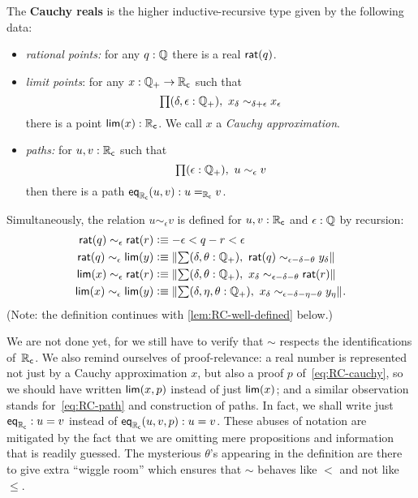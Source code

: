 \begin{defn}\label{defn:cauchy-reals}
  The \textbf{Cauchy reals \RC} is the higher inductive-recursive type given by the
  following data:
  \begin{itemize}
  \item \emph{rational points:} 
    for any $q : \Q$ there is a real $\rcrat(q)$.
  \item \emph{limit points}:
    for any $x : \Qp \to \RC$ such that
    \begin{equation}
      \label{eq:RC-cauchy}
      \prd{\delta, \epsilon : \Qp} x_\delta \sim_{\delta + \epsilon} x_\epsilon
    \end{equation}
    there is a point $\rclim(x) : \RC$. We call $x$ a \emph{Cauchy approximation}.
  \item \emph{paths:}
    for $u, v : \RC$ such that
    \begin{equation}
      \label{eq:RC-path}
      \prd{\epsilon : \Qp} u \sim_\epsilon v
    \end{equation}
    then there is a path $\rceq(u, v) : \id[\RC]{u}{v}$.
  \end{itemize}
  Simultaneously, the relation $u \sim_\epsilon v$ is defined for $u, v : \RC$ and
  $\epsilon : \Q$ by recursion:
  \begin{align*}
    \rcrat(q) \sim_\epsilon \rcrat(r)  &\defeq
    -\epsilon < q - r < \epsilon
    \\
    \rcrat(q) \sim_\epsilon \rclim(y) &\defeq
    \brck{\sm{\delta, \theta : \Qp} \rcrat(q) \sim_{\epsilon - \delta - \theta} y_\delta}
    \\
    \rclim(x) \sim_\epsilon \rcrat(r) &\defeq
    \brck{\sm{\delta, \theta : \Qp} x_\delta \sim_{\epsilon - \delta - \theta} \rcrat(r)}
    \\
    \rclim(x) \sim_\epsilon \rclim(y) &\defeq
    \brck{\sm{\delta, \eta, \theta : \Qp} x_\delta \sim_{\epsilon - \delta - \eta - \theta} y_\eta}.
  \end{align*}  
  (Note: the definition continues with \autoref{lem:RC-well-defined} below.)
\end{defn}

We are not done yet, for we still have to verify that $\sim$ respects the identifications
of~$\RC$. We also remind ourselves of proof-relevance: a real number is represented not
just by a Cauchy approximation $x$, but also a proof $p$ of~\eqref{eq:RC-cauchy}, so we
should have written $\rclim(x,p)$ instead of just $\rclim(x)$; and a similar observation
stands for~\eqref{eq:RC-path} and construction of paths. In fact, we shall write just
$\rceq : u = v$ instead of $\rceq(u, v, p) : u = v$. These abuses of notation are
mitigated by the fact that we are omitting mere propositions and information that is
readily guessed. The mysterious $\theta$'s appearing in the definition are there to give
extra ``wiggle room'' which ensures that $\sim$ behaves like $<$ and not like $\leq$.

